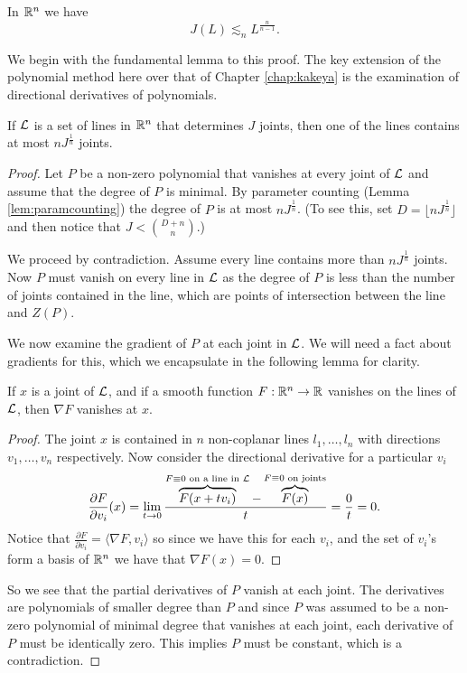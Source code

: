 \begin{theorem}
    In $\mathbb R^n$ we have
      $$J(L) \lesssim_n L^{\frac{n}{n-1}}.$$
\end{theorem}
We begin with the fundamental lemma to this proof. The key extension of the polynomial method here over that of Chapter \ref{chap:kakeya} is the examination of directional derivatives of polynomials.
\begin{lemma}
    If $\mathcal L$ is a set of lines in $\mathbb R^n$ that determines $J$ joints, then one of the lines contains at most $nJ^{\frac{1}{n}}$ joints. \label{joints_bound}
\end{lemma}
\begin{proof}
Let $P$ be a non-zero polynomial that vanishes at every joint of $\mathcal L$ and assume that the degree of $P$ is minimal. By parameter counting (Lemma \ref{lem:paramcounting}) the degree of $P$ is at most 
$nJ^{\frac{1}{n}}$. (To see this, set $D = \lfloor nJ^{\frac{1}{n}}\rfloor$ and then notice that $J < {{D+n}\choose {n}}$.)

We proceed by contradiction. Assume every line contains more than $nJ^{\frac{1}{n}}$ joints.
 Now $P$ must vanish on every line in $\mathcal L$ as the degree of $P$ is less than the number of joints contained in the line, which are points of intersection between the line and $Z(P)$.

We now examine the gradient of $P$ at each joint in $\mathcal L$. We will need a fact about gradients for this, which we encapsulate in the following lemma for clarity.
\begin{lemma}
    If $x$ is a joint of $\mathcal L$, and if a smooth function $F: \mathbb R^n \to \mathbb R$ vanishes on the lines of $\mathcal L$, then $\nabla F$ vanishes at $x$. 
\end{lemma}
\begin{proof}
    The joint $x$ is contained in $n$ non-coplanar lines $l_1, \dots, l_n$ with directions $v_1, \dots , v_n$ respectively. 
    Now consider the directional derivative for a particular $v_i$
    \[
    \frac{\partial F}{\partial v_i} (x) = \lim_{t \to 0} \frac{ \overbrace{F(x+ tv_i)}^{F \equiv 0 \text{ on a line in $\mathcal L$}} - \overbrace{F(x)}^{F \equiv 0 \text{ on joints}}}{t} = \frac{0}{t} = 0.    
    \]
    Notice that $ \frac{\partial F}{\partial v_i} = \langle \nabla F, v_i\rangle$ so since we have this for each $v_i$, and the set of $v_i$'s form a basis of $\mathbb R^n$ we have that $\nabla F(x) = 0$.
\end{proof}
So we see that the partial derivatives of $P$ vanish at each joint. The derivatives are polynomials of
smaller degree than $P$ and since $P$ was assumed to be a non-zero polynomial of minimal degree that
vanishes at each joint, each derivative of $P$ must be identically zero. This implies $P$ must be
constant, which is 
a contradiction.
\end{proof}
